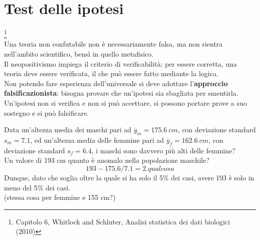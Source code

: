 \documentclass[10pt, draft]{book}
\newcounter{example}[section]
\begin{document}
\chapter{Test delle ipotesi}\footnote{Capitolo 6, Whitlock and Schluter, Analisi statistica dei dati biologici (2010)}
\\
Una teoria non confutabile non è necessariamente falsa, ma non rientra nell’ambito scientifico, bensì in quello metafisico.
\\
Il neopositivismo impiega il criterio di verificabilità: per essere corretta, una teoria deve essere verificata, il che può essere fatto mediante la logica.
\\
Non potendo fare esperienza dell’universale si deve adottare l’\textbf{approccio falsificazionista}: bisogna provare che un’ipotesi sia sbagliata per smentirla.
\\
Un’ipotesi non si verifica e non si può accettare, si possono portare prove a suo sostegno e si può falsificare.
\begin{example}
    Data un'altezza media dei maschi pari ad $\overline{y}_m = 175.6\ cm$, con deviazione standard $s_m= 7.1$, ed un'altezza media delle femmine pari ad $\overline{y}_f = 162.6\ cm$, con deviazione standard $s_f= 6.4$, i maschi sono davvero più alti delle femmine?
    \\
    Un valore di 193 cm quanto è anomalo nella popolazione maschile?
    \begin{equation}
        193-175.6/7.1 = 2.qualcosa
    \end{equation} 
    Dunque, dato che soglia oltre la quale si ha solo il 5\% dei casi, avere 193 è solo in meno del 5\% dei casi.
    \\
    (stessa cosa per femmine e 155 cm?)
\end{example}
\end{document}
